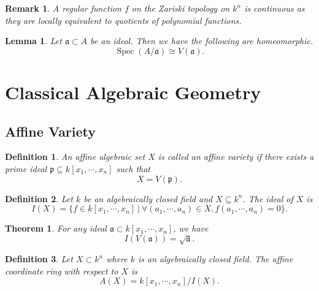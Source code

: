 \documentclass{article}
\newtheorem{theorem}{Theorem}[section]
\newtheorem{definition}{Definition}[section]
\newtheorem{lemma}{Lemma}[section]
\newtheorem{remark}{Remark}[section]
\numberwithin{equation}{section}
\DeclareMathOperator{\Spec}{Spec}
\begin{document}
\begin{remark}
A regular function $f$ on the Zariski topology on $k^n$ is continuous as they are locally equivalent to quotients of polynomial functions.
\label{reg_cont_inc}
\end{remark}

\begin{lemma}
Let $\mathfrak{a}\subset A$ be an ideal. Then we have the following are homeomorphic.
\begin{equation*}
\Spec(A/\mathfrak{a}) \cong V(\mathfrak{a}).
\end{equation*}
\end{lemma}

\section{Classical Algebraic Geometry}

\subsection{Affine Variety}

\begin{definition}
An affine algebraic set $X$ is called an affine variety if there exists a prime ideal $\mathfrak{p}\subseteq k[x_1,\cdots,x_n]$ such that
\begin{equation*}
X=V(\mathfrak{p}).
\end{equation*}
\end{definition}

\begin{definition}
Let $k$ be an algebraically closed field and $X\subseteq k^n$. The ideal of $X$ is 
\begin{equation*}
I(X)=\{f\in k[x_1,\cdots,x_n]\:|\: \forall (a_1,\cdots,a_n)\in X, f(a_1,\cdots,a_n) = 0\}.
\end{equation*}
\end{definition}

\begin{theorem}
For any ideal $\mathfrak{a}\subset k[x_1,\cdots,x_n]$, we have
\begin{equation*}
I(V(\mathfrak{a})) = \sqrt{\mathfrak{a}}.
\end{equation*}
\end{theorem}

\begin{definition}
Let $X\subset k^n$ where $k$ is an algebraically closed field. The affine coordinate ring with respect to $X$ is 
\begin{equation*}
A(X)=k[x_1,\cdots,x_n]/I(X).
\end{equation*}
\end{definition}
\end{document}
